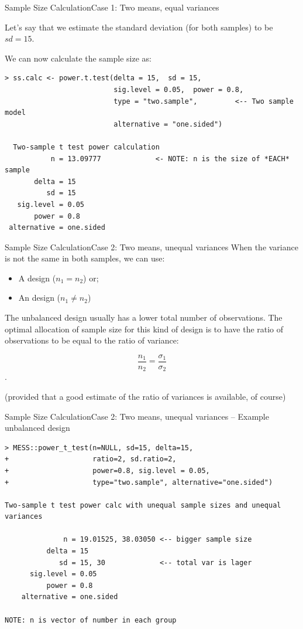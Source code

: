 \begin{frame}[fragile]{Sample Size Calculation}{Case 1: Two means, equal variances}

  Let's say that we estimate the standard deviation (for both samples) to be $sd = 15$.\medskip

  We can now calculate the sample size as:
{\smaller
\begin{verbatim}
> ss.calc <- power.t.test(delta = 15,  sd = 15,
                          sig.level = 0.05,  power = 0.8,
                          type = "two.sample",         <-- Two sample model
                          alternative = "one.sided")

  Two-sample t test power calculation
           n = 13.09777             <- NOTE: n is the size of *EACH* sample
       delta = 15
          sd = 15
   sig.level = 0.05
       power = 0.8
 alternative = one.sided
\end{verbatim}}
\end{frame}


\begin{frame}{Sample Size Calculation}{Case 2: Two means, unequal variances}
  When the variance is not the same in both samples, we can use:
  \begin{itemize}
  \item A  design ($n_1 = n_2$) or;
  \item An  design ($n_1 \neq n_2$)
  \end{itemize}\bigskip

  The unbalanced design usually has a lower total number of
  observations. The optimal allocation of sample size for this kind of
  design is to have the ratio of observations to be equal to the ratio
  of variance:

  $$\frac{n_1}{n_2} = \frac{\sigma_1}{\sigma_2}$$.\bigskip

  (provided that a good estimate of the ratio of variances is available, of course)
  
\end{frame}

\begin{frame}[fragile]{Sample Size Calculation}{Case 2: Two means, unequal variances -- Example unbalanced design}

{\small
\begin{verbatim}
> MESS::power_t_test(n=NULL, sd=15, delta=15, 
+                    ratio=2, sd.ratio=2,
+                    power=0.8, sig.level = 0.05,
+                    type="two.sample", alternative="one.sided")

Two-sample t test power calc with unequal sample sizes and unequal variances 

              n = 19.01525, 38.03050 <-- bigger sample size
          delta = 15
             sd = 15, 30             <-- total var is lager
      sig.level = 0.05
          power = 0.8
    alternative = one.sided

NOTE: n is vector of number in each group
\end{verbatim}}
\end{frame}

